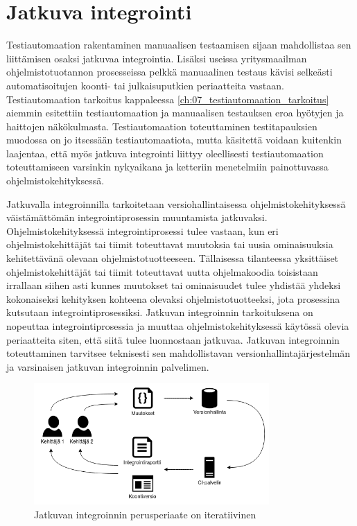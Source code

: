\section{Jatkuva integrointi} \label{ch:07_jatkuva_integrointi}

  Testiautomaation rakentaminen manuaalisen testaamisen sijaan mahdollistaa sen liittämisen osaksi jatkuvaa integrointia.
  Lisäksi useissa yritysmaailman ohjelmistotuotannon prosesseissa pelkkä manuaalinen testaus kävisi selkeästi automatisoitujen koonti- tai julkaisuputkien periaatteita vastaan.
  Testiautomaation tarkoitus kappaleessa \ref{ch:07_testiautomaation_tarkoitus} aiemmin esitettiin testiautomaation ja manuaalisen testauksen eroa hyötyjen ja haittojen näkökulmasta.
  Testiautomaation toteuttaminen testitapauksien muodossa on jo itsessään testiautomaatiota, mutta käsitettä voidaan kuitenkin laajentaa, että myös jatkuva integrointi liittyy oleellisesti testiautomaation toteuttamiseen varsinkin nykyaikana ja ketteriin menetelmiin painottuvassa ohjelmistokehityksessä.

  Jatkuvalla integroinnilla tarkoitetaan versiohallintaisessa ohjelmistokehityksessä väistämättömän integrointiprosessin muuntamista jatkuvaksi.
  Ohjelmistokehityksessä integrointiprosessi tulee vastaan, kun eri ohjelmistokehittäjät tai tiimit toteuttavat muutoksia tai uusia ominaisuuksia kehitettävänä olevaan ohjelmistotuotteeseen.
  Tällaisessa tilanteessa yksittäiset ohjelmistokehittäjät tai tiimit toteuttavat uutta ohjelmakoodia toisistaan irrallaan siihen asti kunnes muutokset tai ominaisuudet tulee yhdistää yhdeksi kokonaiseksi kehityksen kohteena olevaksi ohjelmistotuotteeksi, jota prosessina kutsutaan integrointiprosessiksi.
  Jatkuvan integroinnin tarkoituksena on nopeuttaa integrointiprosessia ja muuttaa ohjelmistokehityksessä käytössä olevia periaatteita siten, että siitä tulee luonnostaan jatkuvaa.
  Jatkuvan integroinnin toteuttaminen tarvitsee teknisesti sen mahdollistavan versionhallintajärjestelmän ja varsinaisen jatkuvan integroinnin palvelimen.

  \begin{figure}[H]
    \centering
    \includegraphics[width=0.8\textwidth]{assets/jatkuva-integrointi.png}
    \caption{Jatkuvan integroinnin perusperiaate on iteratiivinen}
    \label{fig:jatkuva-integrointi}
  \end{figure}

